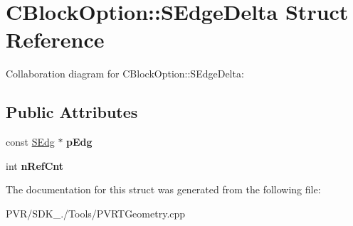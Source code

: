 \hypertarget{struct_c_block_option_1_1_s_edge_delta}{\section{C\+Block\+Option\+:\+:S\+Edge\+Delta Struct Reference}
\label{struct_c_block_option_1_1_s_edge_delta}
}


Collaboration diagram for C\+Block\+Option\+:\+:S\+Edge\+Delta\+:
\subsection*{Public Attributes}
\begin{DoxyCompactItemize}
\item 
\hypertarget{struct_c_block_option_1_1_s_edge_delta_adb579259b74e239e2e09ddf7b0f2c979}{const \hyperlink{struct_s_edg}{S\+Edg} $\ast$ {\bfseries p\+Edg}}\label{struct_c_block_option_1_1_s_edge_delta_adb579259b74e239e2e09ddf7b0f2c979}

\item 
\hypertarget{struct_c_block_option_1_1_s_edge_delta_ad5738e61e9e85fb43265443043beaa72}{int {\bfseries n\+Ref\+Cnt}}\label{struct_c_block_option_1_1_s_edge_delta_ad5738e61e9e85fb43265443043beaa72}

\end{DoxyCompactItemize}


The documentation for this struct was generated from the following file\+:\begin{DoxyCompactItemize}
\item 
P\+V\+R/\+S\+D\+K\+\_./\+Tools/P\+V\+R\+T\+Geometry.\+cpp\end{DoxyCompactItemize}
